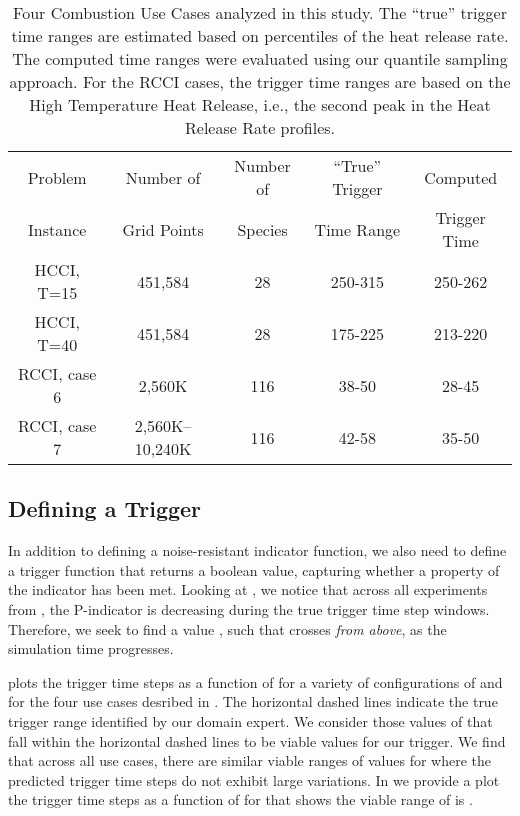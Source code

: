 \documentclass[final]{siamltex}
\newcommand{\pmetric}{P}
\begin{document}
\begin{table}[h]
  \caption{\label{tab:usecases} Four Combustion Use Cases analyzed in this
study. The ``true'' trigger time ranges are estimated based on 
percentiles of the heat release rate. The computed time ranges were evaluated
using our quantile sampling approach.  For the RCCI cases, the trigger time
ranges are based on the High Temperature Heat Release, i.e., the second peak in
the Heat Release Rate profiles.}
\centering
 \begin{tabular}{|c|c|c|c|c|} 
 \hline
 Problem & Number of & Number of & ``True'' Trigger  & Computed  \\
 Instance & Grid Points & Species & Time Range & Trigger Time \\ \hline\hline
 HCCI, T=15   & 451,584     & 28  & 250-315 & 250-262\\  \hline
 HCCI, T=40   & 451,584     & 28  & 175-225 & 213-220 \\  \hline
 RCCI, case 6 & 2,560K   & 116 & 38-50   & 28-45\\  \hline
 RCCI, case 7 & 2,560K--10,240K   & 116 & 42-58   & 35-50\\  \hline
 \end{tabular}
 \end{table}

\subsection{Defining a Trigger}
\label{sec:trigger} 

In addition to defining a noise-resistant indicator function, we also need to define a trigger
function that returns a boolean value, capturing whether a property of the
indicator has been met. Looking at , we notice that across all
experiments from , the \pmetric-indicator is decreasing during the true trigger time
step windows.  Therefore, we seek to find a value 
, such that  crosses  \emph{from
above}, as the simulation time  progresses. 

 plots the trigger time steps as a function of
 for a variety of configurations of  and 
for the four use cases desribed in .  
The horizontal dashed lines indicate the true trigger range identified by our
domain expert.  We consider those values of  that fall within the
horizontal dashed lines to be viable  values for our trigger.  We find that across all
use cases, there are similar viable ranges of values for 
where the predicted trigger time steps do not exhibit large variations. In
 we provide a plot the trigger time steps as a function of
 for 
that shows the viable range of  is .
\end{document}
